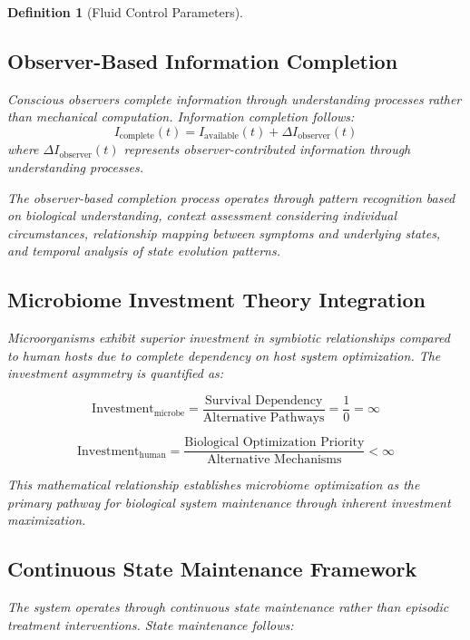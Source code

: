 \documentclass[12pt,a4paper]{article}
\newtheorem{definition}{Definition}
\begin{document}
\begin{definition}[Fluid Control Parameters]
\subsection{Observer-Based Information Completion}

Conscious observers complete information through understanding processes rather than mechanical computation. Information completion follows:
\begin{equation}
I_{\text{complete}}(t) = I_{\text{available}}(t) + \Delta I_{\text{observer}}(t)
\end{equation}
where $\Delta I_{\text{observer}}(t)$ represents observer-contributed information through understanding processes.

The observer-based completion process operates through pattern recognition based on biological understanding, context assessment considering individual circumstances, relationship mapping between symptoms and underlying states, and temporal analysis of state evolution patterns.

\subsection{Microbiome Investment Theory Integration}

Microorganisms exhibit superior investment in symbiotic relationships compared to human hosts due to complete dependency on host system optimization. The investment asymmetry is quantified as:

\begin{equation}
\text{Investment}_{\text{microbe}} = \frac{\text{Survival Dependency}}{\text{Alternative Pathways}} = \frac{1}{0} = \infty
\end{equation}

\begin{equation}
\text{Investment}_{\text{human}} = \frac{\text{Biological Optimization Priority}}{\text{Alternative Mechanisms}} < \infty
\end{equation}

This mathematical relationship establishes microbiome optimization as the primary pathway for biological system maintenance through inherent investment maximization.

\subsection{Continuous State Maintenance Framework}

The system operates through continuous state maintenance rather than episodic treatment interventions. State maintenance follows:


\end{definition}
\end{document}
